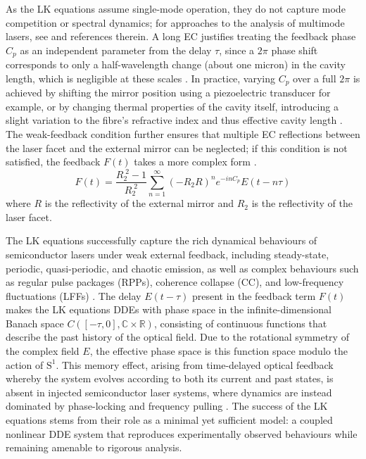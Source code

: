As the LK equations assume single-mode operation, they do not capture mode competition or spectral dynamics; for approaches to the analysis of multimode lasers, see \cite{yacomotti2004dynamics} and references therein.
A long EC justifies treating the feedback phase $C_p$ as an independent parameter from the delay $\tau$, since a $2\pi$ phase shift corresponds to only a half-wavelength change (about one micron) in the cavity length, which is negligible at these scales \cite{green2006mode}. 
In practice, varying $C_p$ over a full $2\pi$ is achieved by shifting the mirror position using a piezoelectric transducer \cite{heil2003delay} for example, or by changing thermal properties of the cavity itself, introducing a slight variation to the fibre's refractive index and thus effective cavity length \cite{skenderas2021feedback}.
The weak-feedback condition further ensures that multiple EC reflections between the laser facet and the external mirror can be neglected; if this condition is not satisfied, the feedback $F(t)$ takes a more complex form \cite{vantartwijk1995semiconductor}.
%
\begin{equation}
\label{eq:multiple_EC}
    F(t) = \frac{R_2^{\;2} - 1}{R_2^{\;2}} \sum_{n=1}^\infty (-R_2 R)^n e^{-i n C_p} E(t-n \tau)
\end{equation}
%
where $R$ is the reflectivity of the external mirror and $R_2$ is the reflectivity of the laser facet.
%
\par
%
The LK equations successfully capture the rich dynamical behaviours of semiconductor lasers under weak external feedback, including steady-state, periodic, quasi-periodic, and chaotic emission, as well as complex behaviours such as regular pulse packages (RPPs), coherence collapse (CC), and low-frequency fluctuations (LFFs) \cite{heil1998coexistence}.
The delay $E(t-\tau)$ present in the feedback term $F(t)$ makes the LK equations DDEs with phase space in the infinite-dimensional Banach space $C([-\tau,0],\mathbb{C}\times\mathbb{R})$, consisting of continuous functions that describe the past history of the optical field.
Due to the rotational symmetry of the complex field $E$, the effective phase space is this function space modulo the action of $\mathrm{S}^1$.
This memory effect, arising from time-delayed optical feedback whereby the system evolves according to both its current and past states, is absent in injected semiconductor laser systems, where dynamics are instead dominated by phase-locking and frequency pulling \cite{wieczorek1999unifying,wieczorek2005dynamical}.
The success of the LK equations stems from their role as a minimal yet sufficient model: a coupled nonlinear DDE system that reproduces experimentally observed behaviours while remaining amenable to rigorous analysis.
